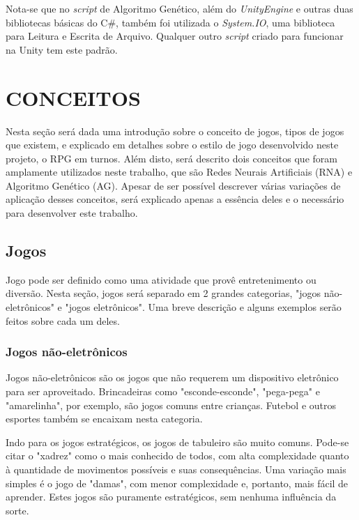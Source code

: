 \documentclass[
	12pt,					%
	openright,				%
	oneside,				%
	a4paper,				%
	bibjustif,				%
	chapter=TITLE,			%
	english,				%
	brazil,					%
	]{abntex2}
\begin{document}
		Nota-se que no \textit{script} de Algoritmo Genético, além do \textit{UnityEngine} e outras duas bibliotecas básicas do C\#,
		também foi utilizada o \textit{System.IO}, uma biblioteca para Leitura e Escrita de Arquivo.
		Qualquer outro \textit{script} criado para funcionar na Unity tem este padrão.

\FloatBarrier
\newpage %
\chapter{CONCEITOS}

	Nesta seção será dada uma introdução sobre o conceito de jogos,
	tipos de jogos que existem,
	e explicado em detalhes sobre o estilo de jogo desenvolvido neste projeto,
	o RPG em turnos.
	Além disto, será descrito dois conceitos que foram amplamente utilizados neste trabalho,
	que são Redes Neurais Artificiais (RNA) e Algoritmo Genético (AG).
	Apesar de ser possível descrever várias variações de aplicação desses conceitos,
	será explicado apenas a essência deles e o necessário para desenvolver este trabalho.
	
	\FloatBarrier
	\section{Jogos}
	Jogo pode ser definido como uma atividade que provê entretenimento ou diversão{}.
	Nesta seção, jogos será separado em 2 grandes categorias,
	"jogos não-eletrônicos"{} e "jogos eletrônicos"{}.
	Uma breve descrição e alguns exemplos serão feitos sobre cada um deles.
	
		\FloatBarrier
		\subsection{Jogos não-eletrônicos}
		Jogos não-eletrônicos são os jogos que não requerem um dispositivo eletrônico para ser aproveitado.
		Brincadeiras como "esconde-esconde"{}, "pega-pega"{} e "amarelinha"{}, por exemplo,
		são jogos comuns entre crianças.
		Futebol e outros esportes também se encaixam nesta categoria.
		
		Indo para os jogos estratégicos,
		os jogos de tabuleiro são muito comuns.
		Pode-se citar o "xadrez"{} como o mais conhecido de todos,
		com alta complexidade quanto à quantidade de movimentos possíveis e suas consequências.
		Uma variação mais simples é o jogo de "damas"{},
		com menor complexidade e, portanto, mais fácil de aprender.
		Estes jogos são puramente estratégicos,
		sem nenhuma influência da sorte.
		
\end{document}
